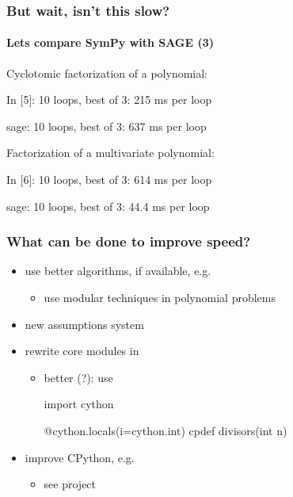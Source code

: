 \documentclass[handout]{beamer}
\begin{document}
\begin{frame}[fragile]
    \frametitle{But wait, isn't this slow?}
    \framesubtitle{Lets compare SymPy with SAGE (3)}

    Cyclotomic factorization of a polynomial:
    \begin{python}
In [5]: %
10 loops, best of 3: 215 ms per loop
    \end{python}
    \begin{python}
sage: %
10 loops, best of 3: 637 ms per loop
    \end{python}

    Factorization of a multivariate polynomial:
    \begin{python}
In [6]: %
10 loops, best of 3: 614 ms per loop
    \end{python}
    \begin{python}
sage: %
10 loops, best of 3: 44.4 ms per loop
    \end{python}
\end{frame}

\begin{frame}[fragile]
    \frametitle{What can be done to improve speed?}

    \begin{itemize}
        \item use better algorithms, if available, e.g.
        \begin{itemize}
            \item use modular techniques in polynomial problems
        \end{itemize}
        \item new assumptions system
        \item rewrite core modules in 
        \begin{itemize}
            \item better (?): use 
\begin{python}
import cython

@cython.locals(i=cython.int)
cpdef divisors(int n)
\end{python}
        \end{itemize}
        \item improve CPython, e.g.
        \begin{itemize}
            \item see  project
        \end{itemize}
    \end{itemize}
\end{frame}
\end{document}
